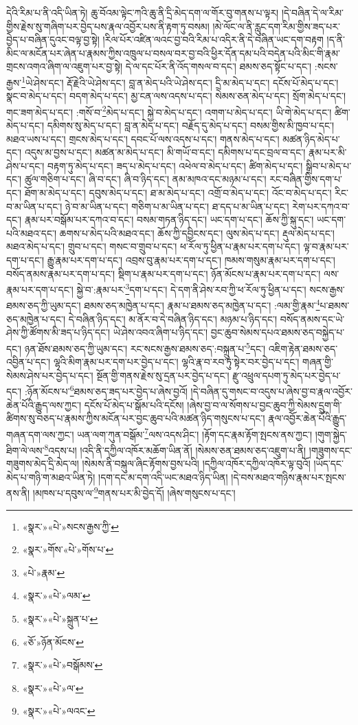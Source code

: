 དེའི་རིམ་པ་ནི་འདི་ཡིན་ཏེ། ཆུ་བོའམ་ལྟེང་ཀའི་ཆུ་ནི་དྲི་མེད་དག་ལ་གོར་བུ་གནས་པ་ལྟར། །དེ་བཞིན་དེ་ལ་རིམ་གྱིས་རྗེས་སུ་གཞིག་པར་བྱེད་པས་རྣལ་འབྱོར་པས་ནི་རྟག་ཏུ་བསམ། །མེ་ལོང་ལ་ནི་རླུང་དག་རིམ་གྱིས་ཟད་པར་བྱེད་པ་བཞིན་དུའང་བལྟ་བྱ་སྟེ། །རིལ་པོར་འཛིན་ལའང་བྱ་བའི་རིམ་པ་འདིར་ནི་དེ་བཞིན་ཡང་དག་བརྟག །ད་ནི་མིང་ལ་མངོན་པར་ཞེན་པ་རྣམས་ཀྱིས་འཁྲུལ་པ་བསལ་བར་བྱ་བའི་ཕྱིར་དོན་དམ་པའི་བདེན་པའི་མིང་གི་རྣམ་གྲངས་འགའ་ཞིག་ལ་འཇུག་པར་བྱ་སྟེ། དེ་ལ་དང་པོར་ནི་འོད་གསལ་བ་དང་། ཐམས་ཅད་སྟོང་པ་དང་། :སངས་རྒྱས་\footnote{«སྣར་»«པེ་»སངས་རྒྱས་ཀྱི་}ཡེ་ཤེས་དང་། རྡོ་རྗེའི་ཡེ་ཤེས་དང་། བླ་ན་མེད་པའི་ཡེ་ཤེས་དང་། དྲི་མ་མེད་པ་དང་། དངོས་པོ་མེད་པ་དང་། སྣང་བ་མེད་པ་དང་། བདག་མེད་པ་དང་། མྱ་ངན་ལས་འདས་པ་དང་། སེམས་ཅན་མེད་པ་དང་། སྲོག་མེད་པ་དང་། གང་ཟག་མེད་པ་དང་། :གསོ་བ་\footnote{«སྣར་»གོས་«པེ་»གོས་པ་}མེད་པ་དང་། སྐྱེ་བ་མེད་པ་དང་། འགག་པ་མེད་པ་དང་། ཡི་གེ་མེད་པ་དང་། ཚིག་མེད་པ་དང་། དམིགས་སུ་མེད་པ་དང་། བླ་ན་མེད་པ་དང་། བརྗོད་དུ་མེད་པ་དང་། བསམ་གྱིས་མི་ཁྱབ་པ་དང་། མཐའ་ཡས་པ་དང་། གྲངས་མེད་པ་དང་། དབང་པོ་ལས་འདས་པ་དང་། གནས་མེད་པ་དང་། མཚན་ཉིད་མེད་པ་དང་། འདུས་མ་བྱས་པ་དང་། མཚན་མ་མེད་པ་དང་། མི་གཡོ་བ་དང་། དམིགས་པ་དང་བྲལ་བ་དང་། རྣམ་པར་མི་ཤེས་པ་དང་། བརྟག་ཏུ་མེད་པ་དང་། ཟད་པ་མེད་པ་དང་། འཕེལ་བ་མེད་པ་དང་། ཚིག་མེད་པ་དང་། སྒྲིབ་པ་མེད་པ་དང་། ཚུལ་གཅིག་པ་དང་། ཞི་བ་དང་། ཞི་བ་ཉིད་དང་། ནམ་མཁའ་དང་མཉམ་པ་དང་། རང་བཞིན་གྱིས་དག་པ་དང་། ཐོག་མ་མེད་པ་དང་། དབུས་མེད་པ་དང་། ཐ་མ་མེད་པ་དང་། འགྲོ་བ་མེད་པ་དང་། འོང་བ་མེད་པ་དང་། རིང་བ་མ་ཡིན་པ་དང་། ཉེ་བ་མ་ཡིན་པ་དང་། གཅིག་པ་མ་ཡིན་པ་དང་། ཐ་དད་པ་མ་ཡིན་པ་དང་། རེག་པར་དཀའ་བ་དང་། རྣམ་པར་བསྒོམ་པར་དཀའ་བ་དང་། བསམ་གཏན་ཉིད་དང་། ཡང་དག་པ་དང་། ཆོས་ཀྱི་སྐུ་དང་། ཡང་དག་པའི་མཐའ་དང་། ཆགས་པ་མེད་པའི་མཐའ་དང་། ཆོས་ཀྱི་དབྱིངས་དང་། ལུས་མེད་པ་དང་། རྡུལ་མེད་པ་དང་། མཐའ་མེད་པ་དང་། གྲུབ་པ་དང་། གསང་བ་གྲུབ་པ་དང་། ཕ་རོལ་ཏུ་ཕྱིན་པ་རྣམ་པར་དག་པ་དང་། ལྟ་བ་རྣམ་པར་དག་པ་དང་། རྒྱུ་རྣམ་པར་དག་པ་དང་། འབྲས་བུ་རྣམ་པར་དག་པ་དང་། ཁམས་གསུམ་རྣམ་པར་དག་པ་དང་། བསོད་ནམས་རྣམ་པར་དག་པ་དང་། སྡིག་པ་རྣམ་པར་དག་པ་དང་། ཉོན་མོངས་པ་རྣམ་པར་དག་པ་དང་། ལས་རྣམ་པར་དག་པ་དང་། སྐྱེ་བ་:རྣམ་པར་\footnote{«པེ་»རྣམ་}དག་པ་དང་། དེ་དག་ནི་ཤེས་རབ་ཀྱི་ཕ་རོལ་ཏུ་ཕྱིན་པ་དང་། སངས་རྒྱས་ཐམས་ཅད་ཀྱི་ཡུམ་དང་། ཐམས་ཅད་མཁྱེན་པ་དང་། རྣམ་པ་ཐམས་ཅད་མཁྱེན་པ་དང་། :ལམ་གྱི་རྣམ་\footnote{«སྣར་»«པེ་»ལམ་}པ་ཐམས་ཅད་མཁྱེན་པ་དང་། དེ་བཞིན་ཉིད་དང་། མ་ནོར་བ་དེ་བཞིན་ཉིད་དང་། མཉམ་པ་ཉིད་དང་། བསོད་ནམས་དང་ཡེ་ཤེས་ཀྱི་ཚོགས་མི་ཟད་པ་ཉིད་དང་། ཡེ་ཤེས་འབའ་ཞིག་པ་ཉིད་དང་། བྱང་ཆུབ་སེམས་དཔའ་ཐམས་ཅད་བསྐྱེད་པ་དང་། ཉན་ཐོས་ཐམས་ཅད་ཀྱི་ཡུམ་དང་། རང་སངས་རྒྱས་ཐམས་ཅད་:བསྐྲུན་པ་\footnote{«སྣར་»«པེ་»སྐྲུན་པ་}དང་། འཇིག་རྟེན་ཐམས་ཅད་འབྱིན་པ་དང་། ལྷའི་མིག་རྣམ་པར་དག་པར་བྱེད་པ་དང་། ལྷའི་རྣ་བ་རབ་ཏུ་སྟེར་བར་བྱེད་པ་དང་། གཞན་གྱི་སེམས་ཤེས་པར་བྱེད་པ་དང་། སྔོན་གྱི་གནས་རྗེས་སུ་དྲན་པར་བྱེད་པ་དང་། རྫུ་འཕྲུལ་དཔག་ཏུ་མེད་པར་བྱེད་པ་དང་། :ཉོན་མོངས་པ་\footnote{«ཅོ་»ཉོན་མོངས་}ཐམས་ཅད་ཟད་པར་བྱེད་པ་ཞེས་བྱའོ། །དེ་བཞིན་དུ་གསང་བ་འདུས་པ་ཞེས་བྱ་བ་རྣལ་འབྱོར་ཆེན་པོའི་རྒྱུད་ལས་ཀྱང་། དངོས་པོ་མེད་པ་སྒོམ་པའི་དངོས། །ཞེས་བྱ་བ་ལ་སོགས་པ་བྱང་ཆུབ་ཀྱི་སེམས་དྲུག་གི་ཚིགས་སུ་བཅད་པ་རྣམས་ཀྱིས་མངོན་པར་བྱང་ཆུབ་པའི་མཚན་ཉིད་གསུངས་པ་དང་། རྣལ་འབྱོར་ཆེན་པོའི་རྒྱུད་གཞན་དག་ལས་ཀྱང་། ཡན་ལག་ཀུན་བསྒོམ་\footnote{«སྣར་»«པེ་»བསྒོམས་}ལས་འདས་ཤིང་། །རྟོག་དང་རྣམ་རྟོག་སྤངས་ནས་ཀྱང་། །གུག་སྐྱེད་ཐིག་ལེ་ལས་\footnote{«སྣར་»«པེ་»ལ་}འདས་པ། །འདི་ནི་དཀྱིལ་འཁོར་མཆོག་ཡིན་ནོ། །སེམས་ཅན་ཐམས་ཅད་འཇུག་པ་ནི། །གཟུགས་དང་གཟུགས་མེད་དྲི་མེད་ལ། །སེམས་ནི་བསྐུལ་ཞིང་རྟོགས་བྱས་པའི། །དཀྱིལ་འཁོར་དཀྱིལ་འཁོར་ལྟ་བུའོ། །ཡོད་དང་མེད་པ་གཉི་ག་མཐའ་ཡིན་ཏེ། །དག་དང་མ་དག་འདི་ཡང་མཐའ་ཉིད་ཡིན། །དེ་བས་མཐའ་གཉིས་རྣམ་པར་སྤངས་ནས་ནི། །མཁས་པ་དབུས་ལ་\footnote{«སྣར་»«པེ་»ལའང་}གནས་པར་མི་བྱེད་དོ། །ཞེས་གསུངས་པ་དང་། 